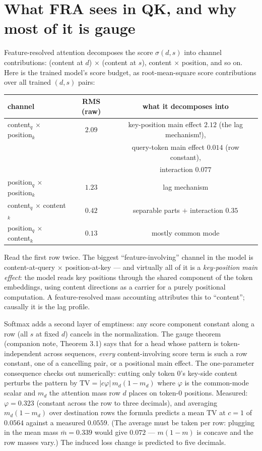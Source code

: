 \documentclass{article}
\begin{document}
\section{What FRA sees in QK, and why most of it is gauge}

Feature-resolved attention decomposes the score $\sigma(d,s)$ into channel
contributions: (content at $d$) $\times$ (content at $s$), content $\times$
position, and so on. Here is the trained model's score budget, as
root-mean-square score contributions over all trained $(d,s)$ pairs:

\begin{center}
\begin{tabular}{lcc}
\toprule
channel & RMS (raw) & what it decomposes into\\
\midrule
content$_q$ $\times$ position$_k$ & $2.09$ & key-position main effect $2.12$
(the lag mechanism!),\\
& & query-token main effect $0.014$ (row constant),\\
& & interaction $0.077$\\
position$_q$ $\times$ position$_k$ & $1.23$ & lag mechanism\\
content$_q$ $\times$ content$_k$ & $0.42$ & separable parts $+$
interaction $0.35$\\
position$_q$ $\times$ content$_k$ & $0.13$ & mostly common mode\\
\bottomrule
\end{tabular}
\end{center}

Read the first row twice. The biggest ``feature-involving'' channel in the
model is content-at-query $\times$ position-at-key --- and virtually all of
it is a \emph{key-position main effect}: the model reads key positions
through the shared component of the token embeddings, using content
directions as a carrier for a purely positional computation. A
feature-resolved mass accounting attributes this to ``content''; causally
it is the lag profile.

Softmax adds a second layer of emptiness: any score component constant
along a row (all $s$ at fixed $d$) cancels in the normalization. The gauge
theorem (companion note, Theorem 3.1) says that for a head whose pattern is
token-independent across sequences, \emph{every} content-involving score
term is such a row constant, one of a cancelling pair, or a positional main
effect. The one-parameter consequence checks out numerically: cutting only
token 0's key-side content perturbs the pattern by
$\mathrm{TV} = |c\varphi|\, m_d(1-m_d)$ where $\varphi$ is the common-mode
scalar and $m_d$ the attention mass row $d$ places on token-0 positions.
Measured: $\varphi = 0.323$ (constant across the row to three decimals),
and averaging $m_d(1-m_d)$ over destination rows the formula predicts a
mean TV at $c=1$ of $0.0564$ against a measured $0.0559$. (The average
must be taken per row: plugging in the mean mass $\bar m = 0.339$ would
give $0.072$ --- $m(1-m)$ is concave and the row masses vary.) The induced
loss change is predicted to five decimals.
\end{document}
